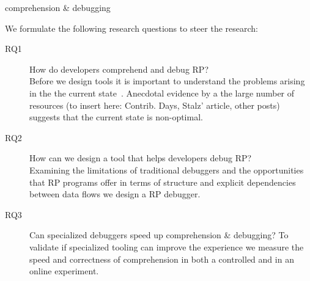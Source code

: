 {\color{red}comprehension \& debugging}

We formulate the following research questions to steer the research: 

\begin{description}
\item[RQ1] How do developers comprehend and debug RP? \\
Before we design tools it is important to understand the problems arising in the the current state~\cite{singer2010examination}. Anecdotal evidence by a the large number of resources ({\color{red}to insert here: Contrib. Days, Stalz' article, other posts}) suggests that the current state is non-optimal.

%

\item[RQ2] How can we design a tool that helps developers debug RP? \\
Examining the limitations of traditional debuggers and the opportunities that RP programs offer in terms of structure and explicit dependencies between data flows we design a RP debugger.


\item[RQ3] Can specialized debuggers speed up comprehension \& debugging?
To validate if specialized tooling can improve the experience we measure the speed and correctness of comprehension in both a controlled and in an online experiment.

\end{description}
